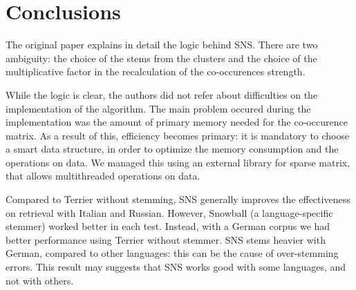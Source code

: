 \section{Conclusions}
The original paper\cite{sns} explains in detail the logic behind SNS. There are two ambiguity: the choice of the stems from the clusters and the choice of the multiplicative factor in the recalculation of the co-occurences strength.

While the logic is clear, the authors did not refer about difficulties on the implementation of the algorithm. The main problem occured during the implementation was the amount of primary memory needed for the co-occurence matrix. As a result of this, efficiency becomes primary: it is mandatory to choose a smart data structure, in order to optimize the memory consumption and the operations on data. We managed this using an external library for sparse matrix, that allows multithreaded operations on data.

Compared to Terrier without stemming, SNS generally improves the effectiveness on retrieval with Italian and Russian. However, Snowball (a language-specific stemmer) worked better in each test. Instead, with a German corpus we had better performance using Terrier without stemmer. SNS stems heavier with German, compared to other languages: this can be the cause of over-stemming errors. This result may suggests that SNS works good with some languages, and not with others.  